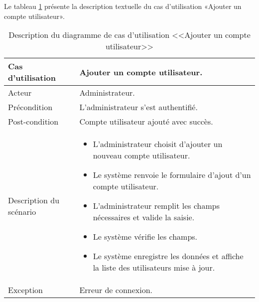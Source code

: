   Le tableau \ref{tab:ajouterCompteUtilisateurTab} présente la description textuelle du cas d’utilisation «Ajouter un compte utilisateur».
\begin{longtable}[c]{
    |p{}
    |p{}|
}
    \caption{Description du diagramme de cas d’utilisation <<Ajouter un compte utilisateur>>}
    \label{tab:ajouterCompteUtilisateurTab}\\
    \hline
    
    Cas d’utilisation
    &  Ajouter un compte utilisateur. \\
    \hline 
    
    Acteur
    & Administrateur. \\
    \hline 
    
    Précondition
    & L’administrateur s’est authentifié. \\
    \hline
    
    Post-condition
    & Compte utilisateur ajouté avec succès. \\
    \hline
    
    Description du
scénario

    &      \begin{itemize}
    \item L’administrateur choisit d’ajouter un nouveau compte utilisateur.
    \item Le système renvoie le formulaire d’ajout d’un compte utilisateur.
     \item L’administrateur remplit les champs nécessaires et valide la saisie.
     \item Le système vérifie les champs.
    \item Le système enregistre les données et affiche la liste des utilisateurs mise à jour.
    \end{itemize}  \\
    \hline
    
   Exception
    & Erreur de connexion.
 \\ \hline
   
\end{longtable}


